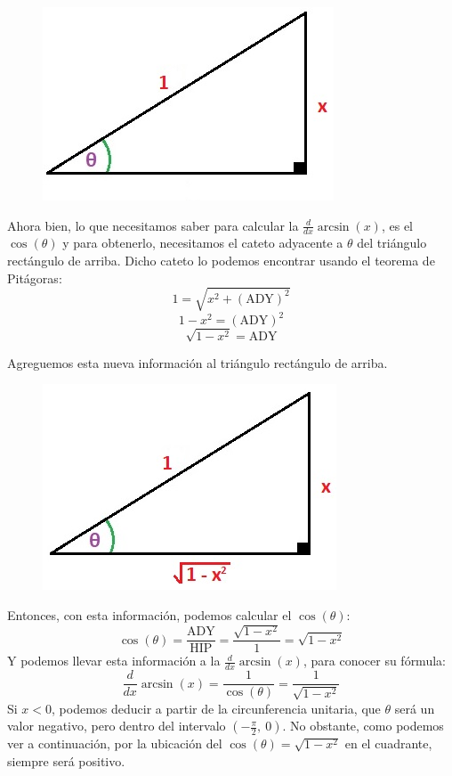 \documentclass[12pt]{article}
\begin{document}
\begin{figure}[hbt!]
\centering
\includegraphics[scale=0.7]{img/rect-trig-deriv-arcsin.jpg}
\end{figure}

Ahora bien, lo que necesitamos saber para calcular la $\frac{d}{dx} \arcsin(x)$, es el $\cos(\theta)$ y para obtenerlo, necesitamos el cateto adyacente a $\theta$ del triángulo rectángulo de arriba. Dicho cateto lo podemos encontrar usando el teorema de Pitágoras:
\[1 = \sqrt{x^{2} + (\text{ADY})^{2}}\]
\[1 - x^{2} = (\text{ADY})^{2}\]
\[\sqrt{1 - x^{2}} = \text{ADY}\]

Agreguemos esta nueva información al triángulo rectángulo de arriba.

\newpage

\begin{figure}[hbt!]
\centering
\includegraphics[scale=0.7]{img/rect-trig-deriv-arcsin-2.jpg}
\end{figure}

Entonces, con esta información, podemos calcular el $\cos(\theta)$:
\[\cos(\theta) = \frac{\text{ADY}}{\text{HIP}} = \frac{\sqrt{1 - x^{2}}}{1} = \sqrt{1 - x^{2}}\]
Y podemos llevar esta información a la $\frac{d}{dx} \arcsin(x)$, para conocer su fórmula:
\[\frac{d}{dx} \arcsin(x) = \frac{1}{\cos(\theta)} = \frac{1}{\sqrt{1 - x^{2}}}\]
Si $x < 0$, podemos deducir a partir de la circunferencia unitaria, que $\theta$ será un valor negativo, pero dentro del intervalo $\left(- \frac{\pi}{2}, \ 0\right)$. No obstante, como podemos ver a continuación, por la ubicación del $\cos(\theta) = \sqrt{1 - x^{2}}$ en el cuadrante, siempre será positivo.
\end{document}
